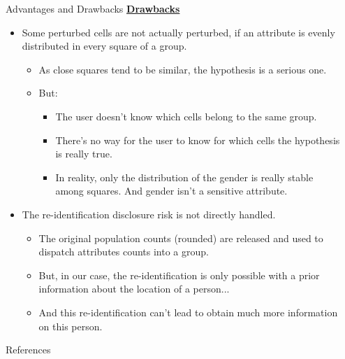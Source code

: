 \documentclass[final,xcolor={dvipsnames,svgnames,table}]{beamer}
\newlength{\sepwidth}
\newlength{\colwidth}
\newcommand{\separatorcolumn}{\begin{column}{\sepwidth}\end{column}}
\begin{document}
\begin{frame}[fragile,t]
\begin{columns}[t]
\begin{column}{\colwidth}
\begin{backblock}{Advantages and Drawbacks}
\underline{\textbf{Drawbacks}}

\begin{itemize}
    \item Some perturbed cells are not actually perturbed, if an attribute is evenly distributed in every square of a group.
    \begin{itemize}
        \item As close squares tend to be similar, the hypothesis is a serious one.
        \item But:
        \begin{itemize}
            \item The user doesn't know which cells belong to the same group.
            \item There's no way for the user to know for which cells the hypothesis is really true.
            \item In reality, only the distribution of the gender is really stable among squares. And gender isn't a sensitive attribute.
        \end{itemize}        
    \end{itemize}
    \item The re-identification disclosure risk is not directly handled.
    \begin{itemize}
        \item The original population counts (rounded) are released
        and used to dispatch attributes counts into a group.
        \item But, in our case, the re-identification is only possible with a prior information about the location of a person...
        \item And this re-identification can't lead to obtain much more information on this person.
    \end{itemize}
\end{itemize}
    
  \end{backblock}

\vspace{-2cm}
  \begin{block}{References}

    \nocite{*}
    \scriptsize{}

  \end{block}

\end{column}

\separatorcolumn
\end{columns}
\end{frame}
\end{document}
